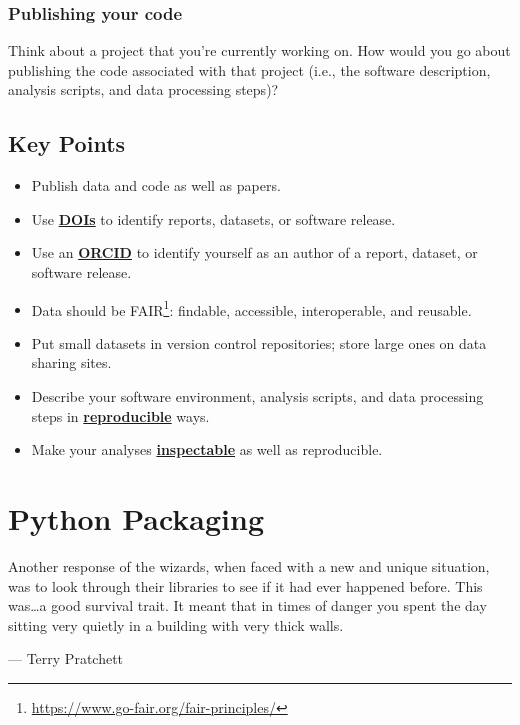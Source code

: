 \documentclass[
]{krantz}
\providecommand{\tightlist}{%
  \setlength{\itemsep}{0pt}\setlength{\parskip}{0pt}}
\renewenvironment{quote}{\begin{VF}}{\end{VF}}
\renewcommand{\href}[2]{#2\footnote{\url{#1}}}
\newcommand{\gref}[2]{\hyperlink{#2}{\textbf{#1}}}
\begin{document}
\hypertarget{provenance-ex-publish-code}{%
\subsection{Publishing your code}\label{provenance-ex-publish-code}}

Think about a project that you're currently working on.
How would you go about publishing the code associated with that project
(i.e., the software description, analysis scripts, and data processing steps)?

\hypertarget{publish-keypoints}{%
\section{Key Points}\label{publish-keypoints}}

\begin{itemize}
\tightlist
\item
  Publish data and code as well as papers.
\item
  Use \gref{DOIs}{doi} to identify reports, datasets, or software release.
\item
  Use an \gref{ORCID}{orcid} to identify yourself as an author of a report, dataset, or software release.
\item
  Data should be \href{https://www.go-fair.org/fair-principles/}{FAIR}: findable, accessible, interoperable, and reusable.
\item
  Put small datasets in version control repositories; store large ones on data sharing sites.
\item
  Describe your software environment, analysis scripts, and data processing steps in \gref{reproducible}{reproducible\_research} ways.
\item
  Make your analyses \gref{inspectable}{inspectability} as well as reproducible.
\end{itemize}

\hypertarget{packaging}{%
\chapter{Python Packaging}\label{packaging}}

\begin{quote}
Another response of the wizards,
when faced with a new and unique situation,
was to look through their libraries to see if it had ever happened before.
This was\ldots a good survival trait.
It meant that in times of danger you spent the day sitting very quietly
in a building with very thick walls.

--- Terry Pratchett
\end{quote}
\end{document}
